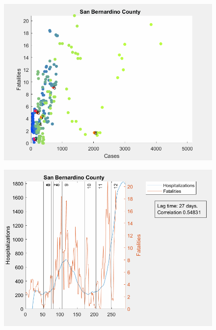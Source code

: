 \documentclass[12pt]{article}
\begin{document}
	\begin{figure}[!h]
		\includegraphics[width=\linewidth]{images/san_bernardino_cases_fatalities_scatter-30lag.png}
		\caption{}
		\label{fig:images/san_bernardino_cases_fatalities_scatter-30lagLabel}
	\end{figure}	


\begin{figure}[!h]
	\includegraphics[width=\linewidth]{images/san_bernardino_hospitalizations_fatalities_line-27lag.png}
	\caption{}
	\label{fig:images/san_bernardino_hospitalizations_fatalities_line-27lagLabel}
\end{figure}
\end{document}
